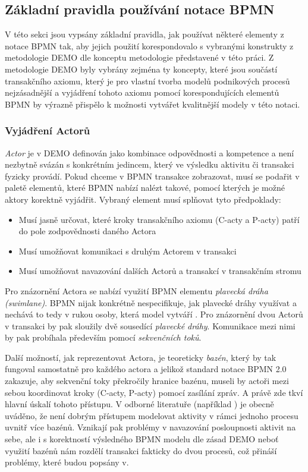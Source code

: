 \documentclass[]{article}
\begin{document}
\subsection{Základní pravidla používání notace BPMN} \label{sec:zakladni_pravidla}
V této sekci jsou vypsány základní pravidla, jak používat některé elementy z notace BPMN tak, aby jejich použití korespondovalo s vybranými konstrukty z metodologie DEMO dle konceptu metodologie představené v této práci. Z metodologie DEMO byly vybrány zejména ty koncepty, které jsou součástí transakčního axiomu, který je pro vlastní tvorba modelů podnikových procesů nejzásadnější a vyjádření tohoto axiomu pomocí korespondujících elementů BPMN by výrazně přispělo k možnosti vytvářet kvalitnější modely v této notaci.
\subsubsection{Vyjádření Actorů}
\textit{Actor} je v DEMO definován jako kombinace odpovědnosti a kompetence a není nezbytně svázán s konkrétním jedincem, který ve výsledku aktivitu či transakci fyzicky provádí. Pokud chceme v BPMN transakce zobrazovat, musí se podařit v paletě elementů, které BPMN nabízí nalézt takové, pomocí kterých je možné aktory korektně vyjádřit. Vybraný element musí splňovat tyto předpoklady:

\begin{itemize}
\item Musí jasně určovat, které kroky transakčního axiomu (C-acty a P-acty) patří do pole zodpovědnosti daného Actora
\item Musí umožňovat komunikaci s druhým Actorem v transakci
\item Musí umožňovat navazování dalších Actorů a transakcí v transakčním stromu
\end{itemize}

Pro znázornění Actora se nabízí využití BPMN elementu \textit{plavecká dráha (swimlane)}. BPMN nijak konkrétně nespecifikuje, jak plavecké dráhy využívat a nechává to tedy v rukou osoby, která model vytváří \cite{Silver2011}. Pro znázornění dvou Actorů v transakci by pak sloužily dvě sousedící \textit{plavecké dráhy}. Komunikace mezi nimi by pak probíhala především pomocí \textit{sekvenčních toků}.

Další možností, jak reprezentovat Actora, je teoreticky \textit{bazén}, který by tak fungoval samostatně pro každého actora a jelikož standard notace BPMN 2.0 zakazuje, aby sekvenční toky překročily hranice bazénu, museli by actoři mezi sebou koordinovat kroky (C-acty, P-acty) pomocí zasílání zpráv. A právě zde tkví hlavní úskalí tohoto přístupu. V odborné literatuře (například \cite{Silver2011}) je obecně uváděno, že není dobrým přístupem modelovat aktivity v rámci jednoho procesu uvnitř více bazénů. Vznikají pak problémy v navazování posloupnosti aktivit na sebe, ale i s korektností výsledného BPMN modelu dle zásad DEMO neboť využití bazénů nám rozdělí transakci fakticky do dvou procesů, což přináší problémy, které budou popsány v. %
\end{document}
